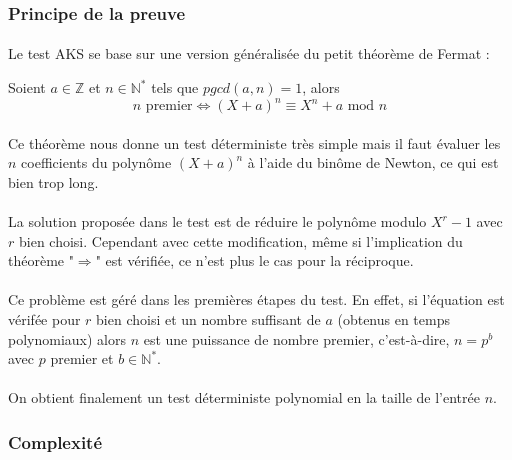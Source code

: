 	\subsubsection{Principe de la preuve}
		\paragraph{}Le test AKS se base sur une version généralisée du petit théorème de Fermat :
		\vspace{-1.5em}\begin{adjustwidth}{1.5cm}{1.5cm} 
		\begin{Th}
			\label{ThFermat3}
			Soient $a \in \mathbb{Z}$ et $n \in \mathbb{N}^{*}$ tels que $pgcd(a,n)=1$, alors
			\[n \text{ premier} \iff (X + a)^{n} \equiv X^{n} + a \text{ mod } n\] 
		\end{Th}
		\end{adjustwidth}\vspace{0.5em}
		
		\paragraph{}Ce théorème nous donne un test déterministe très simple mais il faut évaluer les $n$ coefficients du polynôme $(X + a)^{n}$ à l'aide du binôme de Newton, ce qui est bien trop long.
		\paragraph{}La solution proposée dans le test est de réduire le polynôme modulo $X^{r} - 1$ avec $r$ bien choisi. Cependant avec cette modification, même si l'implication du théorème "$\Rightarrow$" est vérifiée, ce n'est plus le cas pour la réciproque.
		\paragraph{}Ce problème est géré dans les premières étapes du test. En effet, si l'équation est vérifée pour $r$ bien choisi et un nombre suffisant de $a$ (obtenus en temps polynomiaux) alors $n$ est une puissance de nombre premier, c'est-à-dire, $n = p^{b}$ avec $p$ premier et $b \in \mathbb{N}^{*}$.
		\paragraph{}On obtient finalement un test déterministe polynomial en la taille de l'entrée $n$.
		
	\subsubsection{Complexité}
